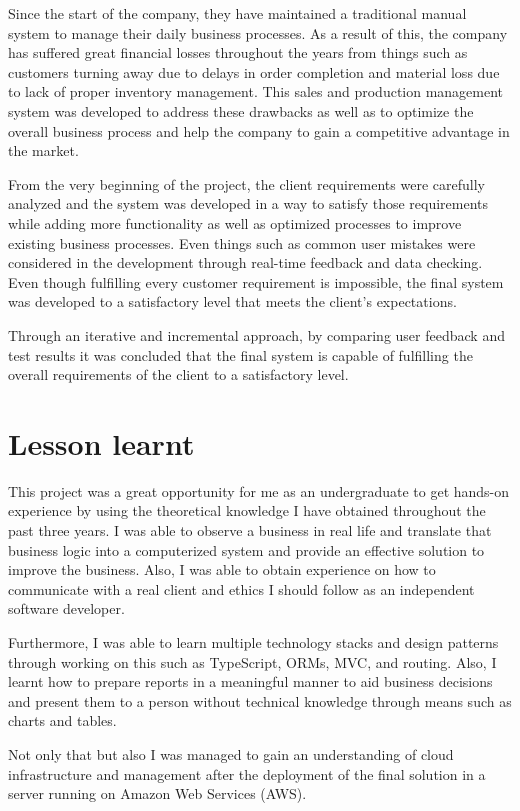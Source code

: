 \documentclass[12pt]{report}
\begin{document}
Since the start of the company, they have maintained a traditional manual system to manage their daily business processes. As a result of this, the company has suffered great financial losses throughout the years from things such as customers turning away due to delays in order completion and material loss due to lack of proper inventory management. This sales and production management system was developed to address these drawbacks as well as to optimize the overall business process and help the company to gain a competitive advantage in the market.

From the very beginning of the project, the client requirements were carefully analyzed and the system was developed in a way to satisfy those requirements while adding more functionality as well as optimized processes to improve existing business processes. Even things such as common user mistakes were considered in the development through real-time feedback and data checking. Even though fulfilling every customer requirement is impossible, the final system was developed to a satisfactory level that meets the client's expectations.

Through an iterative and incremental approach, by comparing user feedback and test results it was concluded that the final system is capable of fulfilling the overall requirements of the client to a satisfactory level.

\section{Lesson learnt}
This project was a great opportunity for me as an undergraduate to get hands-on experience by using the theoretical knowledge I have obtained throughout the past three years. I was able to observe a business in real life and translate that business logic into a computerized system and provide an effective solution to improve the business. Also, I was able to obtain experience on how to communicate with a real client and ethics I should follow as an independent software developer.

Furthermore, I was able to learn multiple technology stacks and design patterns through working on this such as TypeScript, ORMs, MVC, and routing. Also, I learnt how to prepare reports in a meaningful manner to aid business decisions and present them to a person without technical knowledge through means such as charts and tables.

Not only that but also I was managed to gain an understanding of cloud infrastructure and management after the deployment of the final solution in a server running on Amazon Web Services (AWS).
\end{document}
